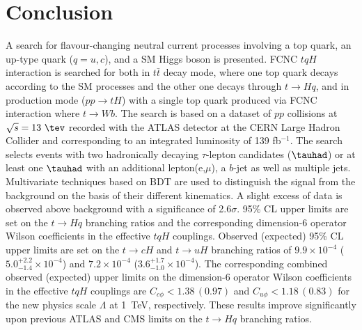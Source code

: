\section{Conclusion}
\label{sec:conclusion}
A search for flavour-changing neutral current processes involving a top quark, an up-type quark ($q=u, c$), and a SM Higgs boson is presented. FCNC $tqH$ interaction is searched for both in $t\bar{t}$ decay mode, where one top quark decays according to the SM processes and the other one decays through $t\rightarrow Hq$, and in production mode ($pp\rightarrow tH$) with a single top quark produced via FCNC interaction where $t\to Wb$. The search is based on a dataset of $pp$ collisions at $\sqrt{s}=13~\tev$ recorded with the ATLAS detector at the CERN Large Hadron Collider and corresponding to an integrated luminosity of 139 fb$^{-1}$. The search selects events with two hadronically decaying $\tau$-lepton candidates ($\tauhad$) or at least one $\tauhad$ with an additional lepton(e,$\mu$), a $b$-jet as well as multiple jets. Multivariate techniques based on BDT are used to distinguish the signal from the background on the basis of their different kinematics.
A slight excess of data is observed above background with a significance of 2.6$\sigma$.  
95\% CL upper limits are set on the $t\to Hq$ branching ratios and the corresponding
dimension-6 operator Wilson coefficients in the effective $tqH$ couplings. 
Observed (expected) 95\% CL upper limits are set on the $t\to cH$ and $t\to uH$ branching ratios of $9.9\times10^{-4}$ ($5.0^{+2.2}_{-1.4}\times10^{-4}$) and $7.2\times10^{-4}$ ($3.6^{+1.7}_{-1.0}\times10^{-4}$).
The corresponding combined observed (expected) upper limits on the dimension-6 operator Wilson coefficients in
the effective $tqH$ couplings are $C_{c\phi} <1.38\, (0.97)$ and $C_{u\phi} <1.18\, (0.83)$ for the new physics scale $\Lambda$ at 1~TeV, respectively.
These results improve significantly upon previous ATLAS and CMS limits on the $t\rightarrow Hq$ branching ratios.

